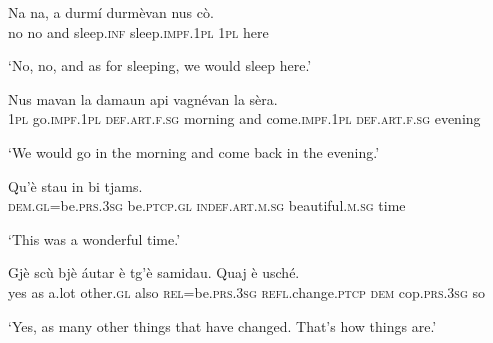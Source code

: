 \begin{linenumbers}
\gll    Na na, a durmí durmèvan nus cò. \\
no no and sleep.\textsc{inf} sleep.\textsc{impf.1pl} \textsc{1pl} here \\
\end{linenumbers}
\medskip
\glt `No, no, and as for sleeping, we would sleep here.'
\medskip

\begin{linenumbers}
\gll    Nus mavan la damaun api vagnévan la sèra. \\
 \textsc{1pl} go.\textsc{impf.1pl}  \textsc{def.art.f.sg} morning and come.\textsc{impf.1pl} \textsc{def.art.f.sg} evening \\
\end{linenumbers}
\medskip
\glt `We would go in the morning and come back in the evening.'
\medskip

\begin{linenumbers}
\gll    Qu’è stau in bi tjams. \\
 \textsc{dem.gl}=be.\textsc{prs.3sg} be.\textsc{ptcp.gl} \textsc{indef.art.m.sg} beautiful.\textsc{m.sg} time\\
\end{linenumbers}
\medskip
\glt `This was a wonderful time.'
\medskip

\begin{linenumbers}
\gll    Gjè scù bjè áutar è tg’è samidau. Quaj è usché. \\
yes as a.lot other.\textsc{gl} also \textsc{rel=}be.\textsc{prs.3sg} \textsc{refl.}change.\textsc{ptcp}  \textsc{dem} cop.\textsc{prs.3sg} so\\
\end{linenumbers}
\medskip
\glt `Yes, as many other things that have changed. That’s how things are.'
\medskip



